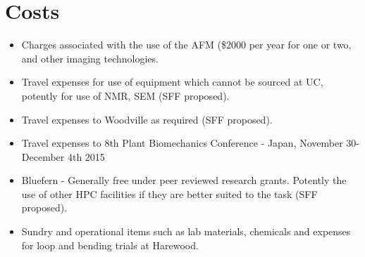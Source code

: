 \chapter{Costs}

\begin{itemize}
\item Charges associated with the use of the AFM (\$2000 per year for one or two, and other imaging technologies.
\end{itemize}

\begin{itemize}
\item Travel expenses for use of equipment which cannot be sourced at UC, potently for
use of NMR, SEM (SFF proposed).
\end{itemize}

\begin{itemize}
\item Travel expenses to Woodville as required (SFF proposed).
\end{itemize}
\begin{itemize}
\item Travel expenses to 8th Plant Biomechanics Conference - Japan, November
30-December 4th 2015
\end{itemize}

\begin{itemize}
\item Bluefern - Generally free under peer reviewed research grants. Potently the use
of other HPC facilities if they are better suited to the task (SFF proposed).
\end{itemize}

\begin{itemize}
\item Sundry and operational items such as lab materials, chemicals and expenses for
loop and bending trials at Harewood.
\end{itemize}
